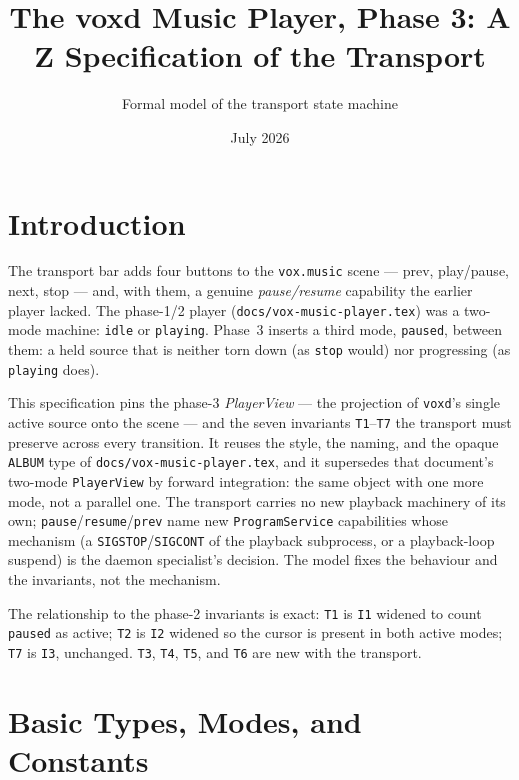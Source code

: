 \documentclass[a4paper,10pt,fleqn]{article}
\begin{document}
\title{The voxd Music Player, Phase 3: A Z Specification of the Transport}
\author{Formal model of the transport state machine}
\date{July 2026}
\maketitle

\section{Introduction}

The transport bar adds four buttons to the \texttt{vox.music} scene --- prev,
play/pause, next, stop --- and, with them, a genuine \emph{pause/resume}
capability the earlier player lacked. The phase-1/2 player
(\texttt{docs/vox-music-player.tex}) was a two-mode machine: \texttt{idle} or
\texttt{playing}. Phase~3 inserts a third mode, \texttt{paused}, between them: a
held source that is neither torn down (as \texttt{stop} would) nor progressing
(as \texttt{playing} does).

This specification pins the phase-3 \emph{PlayerView} --- the projection of
\texttt{voxd}'s single active source onto the scene --- and the seven invariants
\texttt{T1}--\texttt{T7} the transport must preserve across every transition. It
reuses the style, the naming, and the opaque \texttt{ALBUM} type of
\texttt{docs/vox-music-player.tex}, and it supersedes that document's two-mode
\texttt{PlayerView} by forward integration: the same object with one more mode,
not a parallel one. The transport carries no new playback machinery of its own;
\texttt{pause}/\texttt{resume}/\texttt{prev} name new \texttt{ProgramService}
capabilities whose mechanism (a \texttt{SIGSTOP}/\texttt{SIGCONT} of the playback
subprocess, or a playback-loop suspend) is the daemon specialist's decision. The
model fixes the behaviour and the invariants, not the mechanism.

The relationship to the phase-2 invariants is exact: \texttt{T1} is \texttt{I1}
widened to count \texttt{paused} as active; \texttt{T2} is \texttt{I2} widened so
the cursor is present in both active modes; \texttt{T7} is \texttt{I3},
unchanged. \texttt{T3}, \texttt{T4}, \texttt{T5}, and \texttt{T6} are new with the
transport.

\section{Basic Types, Modes, and Constants}
\label{sec:types}
\end{document}
